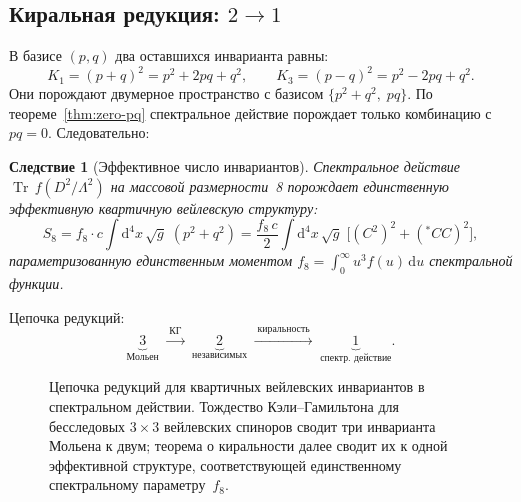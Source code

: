 \documentclass[12pt,a4paper]{article}
\newtheorem{corollary}[theorem]{Следствие}
\theoremstyle{definition}
\theoremstyle{remark}
\newcommand{\dd}{\mathrm{d}}
\newcommand{\Tr}{\operatorname{Tr}}
\newcommand{\Lam}{\Lambda}
\begin{document}
\subsection{Киральная редукция: \texorpdfstring{$2 \to 1$}{2 -> 1}}

В базисе $(p, q)$ два оставшихся инварианта равны:
\begin{equation}
  K_1 = (p + q)^2 = p^2 + 2pq + q^2, \qquad
  K_3 = (p - q)^2 = p^2 - 2pq + q^2.
\end{equation}
Они порождают двумерное пространство с базисом $\{p^2 + q^2,\; pq\}$.
По теореме~\ref{thm:zero-pq} спектральное действие порождает только
комбинацию с $pq = 0$.  Следовательно:

\begin{corollary}[Эффективное число инвариантов]
\label{cor:one-invariant}
Спектральное действие $\Tr\,f(D^2/\Lam^2)$ на массовой размерности~8
порождает единственную эффективную квартичную вейлевскую структуру:
\begin{equation}\label{eq:one-structure}
  S_8 = f_8 \cdot c \int \dd^4x\,\sqrt{g}\;(p^2 + q^2)
  = \frac{f_8\,c}{2}\int \dd^4x\,\sqrt{g}\;
  \bigl[(C^2)^2 + ({}^{\ast}\!CC)^2\bigr],
\end{equation}
параметризованную единственным моментом
$f_8 = \int_0^\infty u^3 f(u)\,\dd u$ спектральной функции.
\end{corollary}

\noindent Цепочка редукций:
\begin{equation}\label{eq:chain}
  \underbrace{3}_{\text{Мольен}}
  \;\xrightarrow{\;\text{КГ}\;}\;
  \underbrace{2}_{\text{независимых}}
  \;\xrightarrow{\;\text{киральность}\;}\;
  \underbrace{1}_{\text{спектр. действие}}.
\end{equation}

\begin{figure}[ht]
\centering
{}
\caption{Цепочка редукций для квартичных вейлевских инвариантов в
спектральном действии.  Тождество Кэли--Гамильтона для бесследовых
$3 \times 3$ вейлевских спиноров сводит три инварианта Мольена к двум;
теорема о киральности далее сводит их к одной эффективной структуре,
соответствующей единственному спектральному параметру~$f_8$.}
\label{fig:reduction-chain}
\end{figure}
\end{document}
